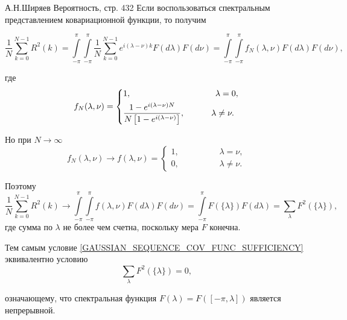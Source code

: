 		\begin{Remark}{А.Н.Ширяев Вероятность, стр. 432}
			Если воспользоваться спектральным представлением ковариационной функции, то получим
			
			\begin{equation*}
				\frac{1}{N}\sum\limits_{k = 0}^{N-1} R^2(k) = \int\limits_{-\pi}^{\pi} \int\limits_{-\pi}^{\pi} \frac{1}{N} \sum\limits_{k = 0}^{N-1} e^{i(\lambda - \nu)k} F(d\lambda)F(d\nu) = \int\limits_{-\pi}^{\pi} \int\limits_{-\pi}^{\pi} f_N(\lambda, \nu) F(d\lambda)F(d\nu),
			\end{equation*}
			
			\noindent где 
			\begin{equation*}
				f_N(\lambda, \nu) = \begin{cases*}
					1, \hspace{3.5cm} \lambda = 0, \\
					\displaystyle\frac{1 - e^{i(\lambda - \nu)N}}{N\left[1 - e^{i(\lambda - \nu)}\right]}, \hspace{1.1cm} \lambda \neq \nu.
				\end{cases*}
			\end{equation*}
		
			\noindent Но при $N \rightarrow \infty$
			\begin{equation*}
				f_N(\lambda, \nu) \longrightarrow f(\lambda, \nu) = \begin{cases*}
					1, \hspace{2cm} \lambda = \nu, \\
					0, \hspace{2cm} \lambda \neq \nu.
				\end{cases*}
			\end{equation*}
		
			\noindent Поэтому 
			\begin{equation*}
				\frac{1}{N}\sum\limits_{k=0}^{N-1} R^2(k) \longrightarrow \int\limits_{-\pi}^{\pi} \int\limits_{-\pi}^{\pi} f(\lambda, \nu) F(d\lambda)F(d\nu) = \int\limits_{-\pi}^{\pi}F(\{\lambda\}) F(d\lambda) = \sum\limits_{\lambda} F^2(\{\lambda\}),
			\end{equation*}
			\noindent где сумма по $\lambda$ не более чем счетна, поскольку мера $F$ конечна.
			
			\noindent Тем самым условие \eqref{GAUSSIAN_SEQUENCE_COV_FUNC_SUFFICIENCY} эквивалентно условию
			\begin{equation*}
				\sum\limits_{\lambda} F^2(\{\lambda\}) = 0,
			\end{equation*}
			
			\noindent означающему, что спектральная функция $F(\lambda) = F([-\pi, \lambda])$ является непрерывной.
		\end{Remark}
